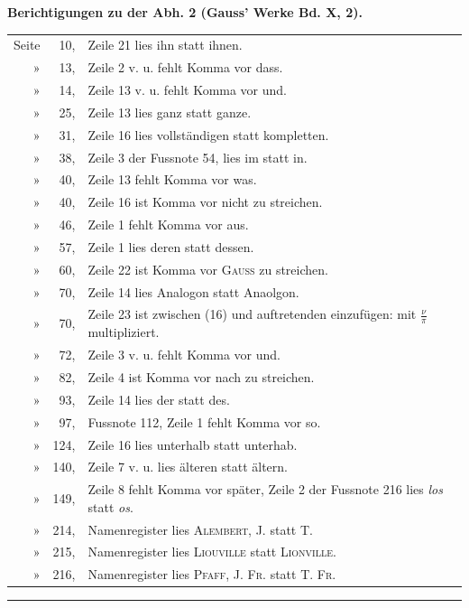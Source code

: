 \par\clearpage{}
\begin{center}\textbf{Berichtigungen zu der Abh. 2 (Gauss’ Werke Bd. X, 2).}\end{center}
\begingroup
\fontsize{9.2}{13}\selectfont
\setlength{\tabcolsep}{3pt}
\noindent\begin{tabular}{@{}r r p{.81\linewidth}@{}}
Seite & 10, & Zeile 21 lies ihn statt ihnen.\\
» & 13, & Zeile 2 v. u. fehlt Komma vor dass.\\
» & 14, & Zeile 13 v. u. fehlt Komma vor und.\\
» & 25, & Zeile 13 lies ganz statt ganze.\\
» & 31, & Zeile 16 lies vollständigen statt kompletten.\\
» & 38, & Zeile 3 der Fussnote 54, lies im statt in.\\
» & 40, & Zeile 13 fehlt Komma vor was.\\
» & 40, & Zeile 16 ist Komma vor nicht zu streichen.\\
» & 46, & Zeile 1 fehlt Komma vor aus.\\
» & 57, & Zeile 1 lies deren statt dessen.\\
» & 60, & Zeile 22 ist Komma vor \textsc{Gauss} zu streichen.\\
» & 70, & Zeile 14 lies Analogon statt Anaolgon.\\
» & 70, & Zeile 23 ist zwischen (16) und auftretenden einzufügen: mit \(\displaystyle\frac\nu\pi\) multipliziert.\\
» & 72, & Zeile 3 v. u. fehlt Komma vor und.\\
» & 82, & Zeile 4 ist Komma vor nach zu streichen.\\
» & 93, & Zeile 14 lies der statt des.\\
» & 97, & Fussnote 112, Zeile 1 fehlt Komma vor so.\\
» & 124, & Zeile 16 lies unterhalb statt unterhab.\\
» & 140, & Zeile 7 v. u. lies älteren statt ältern.\\
» & 149, & Zeile 8 fehlt Komma vor später, Zeile 2 der Fussnote 216 lies \textit{los} statt \textit{os}.\\
» & 214, & Namenregister lies \textsc{Alembert}, J. statt T.\\
» & 215, & Namenregister lies \textsc{Liouville} statt \textsc{Lionville}.\\
» & 216, & Namenregister lies \textsc{Pfaff}, J. \textsc{Fr.} statt T. \textsc{Fr.}\\
\end{tabular}
\par\bigskip\begin{center}\rule{.23\linewidth}{.3pt}\end{center}
\par\clearpage\endgroup
